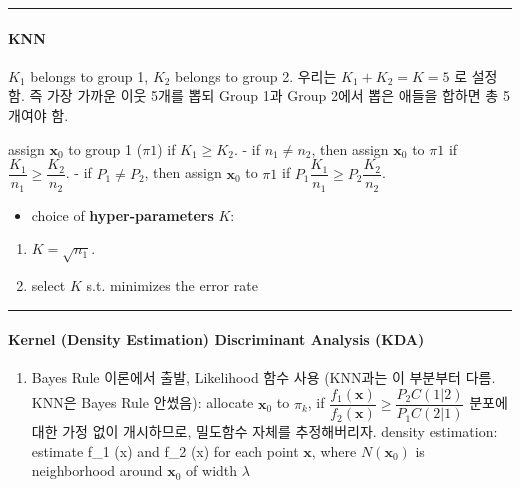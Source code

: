\documentclass[
]{book}
\providecommand{\tightlist}{%
  \setlength{\itemsep}{0pt}\setlength{\parskip}{0pt}}
\begin{document}
{{{\begin{center}\rule{0.5\linewidth}{0.5pt}\end{center}

\hypertarget{knn}{%
\paragraph{KNN}\label{knn}}

\(K_1\) belongs to group 1, \(K_2\) belongs to group 2. 우리는 \(K_1 + K_2 =K =5\) 로 설정함. 즉 가장 가까운 이웃 5개를 뽑되 Group 1과 Group 2에서 뽑은 애들을 합하면 총 5개여야 함.

assign \(\pmb x_0\) to group 1 (\(\pi1\)) if \(K_1 \ge K_2\).
- if \(n_1 \not = n_2\), then assign \(\pmb x_0\) to \(\pi1\) if \(\dfrac{K_1}{n_1} \ge \dfrac{K_2}{n_2}\).
- if \(P_1 \not = P_2\), then assign \(\pmb x_0\) to \(\pi1\) if \(P_1\dfrac{K_1}{n_1} \ge P_2\dfrac{K_2}{n_2}\).

\begin{itemize}
\tightlist
\item
  choice of \textbf{hyper-parameters} \(K\):
\end{itemize}

\begin{enumerate}
\def\labelenumi{\arabic{enumi}.}
\tightlist
\item
  \(K = \sqrt{n_1}\).
\item
  select \(K\) s.t. minimizes the error rate
\end{enumerate}

\begin{center}\rule{0.5\linewidth}{0.5pt}\end{center}

\hypertarget{kernel-density-estimation-discriminant-analysis-kda}{%
\paragraph{Kernel (Density Estimation) Discriminant Analysis (KDA)}\label{kernel-density-estimation-discriminant-analysis-kda}}

\begin{enumerate}
\def\labelenumi{\arabic{enumi}.}
\item
  Bayes Rule 이론에서 출발, Likelihood 함수 사용 (KNN과는 이 부분부터 다름. KNN은 Bayes Rule 안썼음): allocate \(\pmb x_0\) to \(\pi_k\), if \(\dfrac{f_1 (\pmb x)}{f_2 (\pmb x)} \ge \dfrac{P_2 C(1 \vert 2)}{P_1 C(2 \vert 1)}\)
  분포에 대한 가정 없이 개시하므로, 밀도함수 자체를 추정해버리자. density estimation: estimate f\_1 (\pmb x) and f\_2 (\pmb x) for each point \(\pmb x\), where \(N(\pmb x_0)\) is neighborhood around \(\pmb x_0\) of width \(\lambda\)


\end{enumerate}}}}
\end{document}

